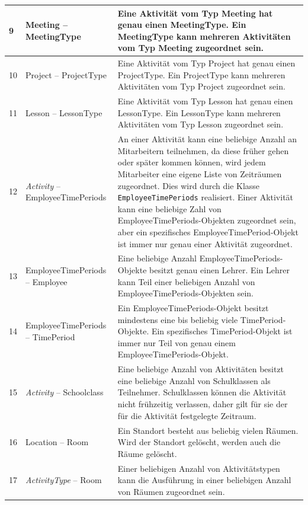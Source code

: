 \documentclass[fontsize=12pt,paper=a4,twoside]{scrartcl}
\begin{document}
\begin{tabularx}{\textwidth}{|p{0.6cm}|p{5cm}|X|}
\hline
9	& Meeting -- MeetingType 			 & Eine Aktivität vom Typ Meeting hat genau einen
	MeetingType. Ein MeetingType kann mehreren Aktivitäten vom Typ Meeting zugeordnet sein. \\\hline
10	& Project -- ProjectType			& Eine Aktivität vom Typ Project hat genau einen
	ProjectType. Ein ProjectType kann mehreren Aktivitäten vom Typ Project zugeordnet sein. \\\hline
11	& Lesson -- LessonType				& Eine Aktivität vom Typ Lesson hat genau einen
	LessonType. Ein LessonType kann mehreren Aktivitäten vom Typ Lesson zugeordnet sein. \\\hline
12 	& \textit{Activity} -- EmployeeTimePeriods		& An einer Aktivität kann eine beliebige
	Anzahl an Mitarbeitern teilnehmen, da diese früher gehen oder später kommen können, wird jedem Mitarbeiter eine eigene Liste von Zeiträumen zugeordnet. Dies wird durch die Klasse \texttt{EmployeeTimePeriods} realisiert. Einer Aktivität kann eine beliebige Zahl von EmployeeTimePeriods-Objekten zugeordnet sein, aber ein spezifisches EmployeeTimePeriod-Objekt ist immer nur genau einer Aktivität zugeordnet. \\\hline
13 	& EmployeeTimePeriods -- Employee 				& Eine beliebige Anzahl
	EmployeeTimePeriods-Objekte besitzt genau einen Lehrer. Ein Lehrer kann Teil einer beliebigen Anzahl von EmployeeTimePeriods-Objekten sein. \\\hline
14	& EmployeeTimePeriods -- TimePeriod 			& Ein EmployeeTimePeriods-Objekt besitzt
	mindestens eine bis beliebig viele TimePeriod-Objekte. Ein spezifisches TimePeriod-Objekt ist immer nur Teil von genau einem EmployeeTimePeriods-Objekt. \\\hline
15	& \textit{Activity} -- Schoolclass				& Eine beliebige Anzahl von Aktivitäten
	besitzt eine beliebige Anzahl von Schulklassen als Teilnehmer. Schulklassen können die Aktivität nicht
	frühzeitig verlassen, daher gilt für sie der für die Aktivität festgelegte Zeitraum.\\\hline
16	& Location -- Room						& Ein Standort besteht aus beliebig vielen Räumen. 
	Wird der Standort gelöscht, werden auch die Räume gelöscht.\\\hline
17	& \textit{ActivityType} -- Room					& Einer beliebigen Anzahl von Aktivitätstypen
	kann die Ausführung in einer beliebigen Anzahl von Räumen zugeordnet sein. \\\hline
\end{tabularx}
\end{document}
